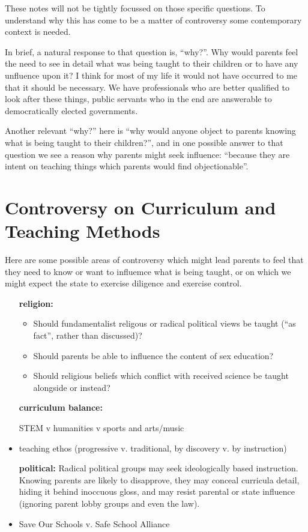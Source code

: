 \documentclass[10pt,titlepage]{article}
\begin{document}
These notes will not be tightly focussed on those specific questions.
To understand why this has come to be a matter of controversy some contemporary context is needed.

In brief, a natural response to that question is, ``why?''.
Why would parents feel the need to see in detail what was being taught to their children or to have any unfluence upon it?
I think for most of my life it would not have occurred to me that it should be necessary.
We have professionals who are better qualified to look after these things, public servants who in the end are answerable to democratically elected governments.

Another relevant ``why?'' here is ``why would anyone object to parents knowing what is being taught to their children?'', and in one possible answer to that question we see a reason why parents might seek influence: ``because they are intent on teaching things which parents would find objectionable''.


\section{Controversy on Curriculum and Teaching Methods}

Here are some possible areas of controversy which might lead parents to feel that they need to know or want to influemce what is being taught, or on which we might expect the state to exercise diligence and exercise control.

\begin{itemize}

\item[\bf religion:]

  \begin{itemize}
    
  \item Should fundamentalist religous or radical political views be taught (``as fact'', rather than discussed)?
  \item Should parents be able to influence the content of sex education?
    \item Should religious beliefs which conflict with received science be taught alongside or instead?
  \end{itemize}
  
\item[\bf curriculum balance:]

  STEM v humanities v sports and arts/music

  \item teaching ethos (progressive v. traditional, by discovery v. by instruction)

  \item[\bf political:]
    Radical political groups may seek ideologically based instruction.
    Knowing parents are likely to disapprove, they may conceal curricula detail, hiding it behind inoccuous gloss, and may resist parental or state influence (ignoring parent lobby groups and even the law).

    \item Save Our Schools v. Safe School Alliance
    
\end{itemize}
\end{document}
